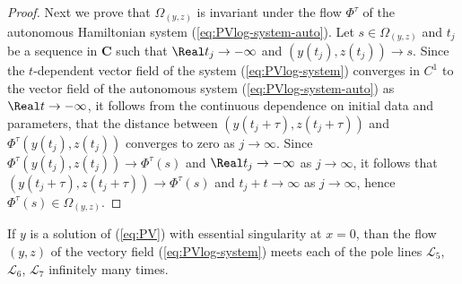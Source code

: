 \begin{proof}
Next we prove that $\Omega_{(y,z)}$ is invariant under the flow $\Phi^{\tau}$ of the autonomous Hamiltonian system (\ref{eq:PVlog-system-auto}).
Let $s\in\Omega_{(y,z)}$ and $t_j$ be a sequence in $\mathbf{C}$ such that $\Real t_j\to-\infty$ and $(y(t_j),z(t_j))\to s$.
Since the $t$-dependent vector field of the system (\ref{eq:PVlog-system}) converges in $C^1$ to the vector field of the autonomous system (\ref{eq:PVlog-system-auto}) as $\Real t\to-\infty$, it follows from the continuous dependence on initial data and parameters, that the distance between $(y(t_j+\tau),z(t_j+\tau))$ and $\Phi^{\tau}(y(t_j),z(t_j))$ converges to zero as $j\to\infty$.
Since $\Phi^{\tau}(y(t_j),z(t_j))\to\Phi^{\tau}(s)$ and $\Real t_j\to-\infty$ as $j\to\infty$, 
it follows that $(y(t_j+\tau),z(t_j+\tau))\to\Phi^{\tau}(s)$ and $t_j+t\to\infty$ as $j\to\infty$, hence $\Phi^{\tau}(s)\in\Omega_{(y,z)}$.
\end{proof}

\begin{proposition}\label{prop:intersections}
If $y$ is a solution of (\ref{eq:PV}) with essential singularity at $x=0$, than the flow $(y,z)$ of the vectory field (\ref{eq:PVlog-system})  meets each of the pole lines $\mathcal{L}_5$, $\mathcal{L}_6$, $\mathcal{L}_7$ infinitely many times.
\end{proposition}

